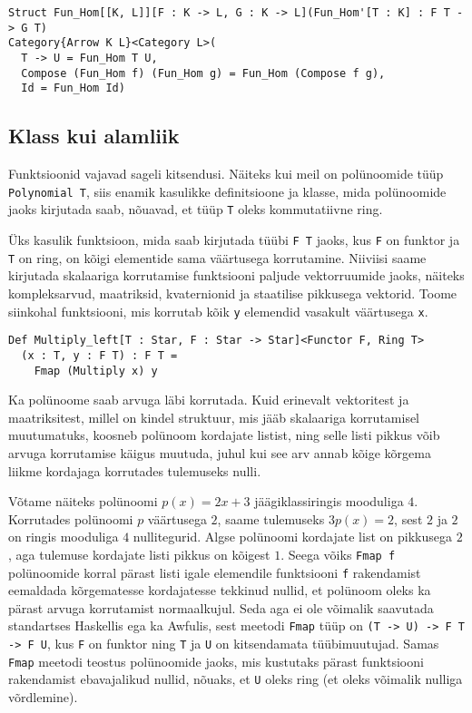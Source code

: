 \documentclass[12pt]{article}
\begin{document}
        \begin{verbatim}Struct Fun_Hom[[K, L]][F : K -> L, G : K -> L](Fun_Hom'[T : K] : F T -> G T)
Category{Arrow K L}<Category L>(
  T -> U = Fun_Hom T U,
  Compose (Fun_Hom f) (Fun_Hom g) = Fun_Hom (Compose f g),
  Id = Fun_Hom Id)\end{verbatim}
    \subsection{Klass kui alamliik}\label{klassliik}
      Funktsioonid vajavad sageli kitsendusi. Näiteks kui meil on polünoomide tüüp \verb!Polynomial T!, siis enamik kasulikke definitsioone ja klasse, mida polünoomide jaoks kirjutada saab, nõuavad, et tüüp \verb!T! oleks kommutatiivne ring.

      Üks kasulik funktsioon, mida saab kirjutada tüübi \verb!F T! jaoks, kus \verb!F! on funktor ja \verb!T! on ring, on kõigi elementide sama väärtusega korrutamine. Niiviisi saame kirjutada skalaariga korrutamise funktsiooni paljude vektorruumide jaoks, näiteks kompleksarvud, maatriksid, kvaternionid ja staatilise pikkusega vektorid. Toome siinkohal funktsiooni, mis korrutab kõik \verb!y! elemendid vasakult väärtusega \verb!x!.

      \begin{verbatim}Def Multiply_left[T : Star, F : Star -> Star]<Functor F, Ring T>
  (x : T, y : F T) : F T =
    Fmap (Multiply x) y\end{verbatim}

      Ka polünoome saab arvuga läbi korrutada. Kuid erinevalt vektoritest ja maatriksitest, millel on kindel struktuur, mis jääb skalaariga korrutamisel muutumatuks, koosneb polünoom kordajate listist, ning selle listi pikkus võib arvuga korrutamise käigus muutuda, juhul kui see arv annab kõige kõrgema liikme kordajaga korrutades tulemuseks nulli.

      Võtame näiteks polünoomi $p(x)=2x+3$ jäägiklassiringis mooduliga $4$. Korrutades polünoomi $p$ väärtusega $2$, saame tulemuseks $3p(x)=2$, sest $2$ ja $2$ on ringis mooduliga $4$ nullitegurid. Algse polünoomi kordajate list on pikkusega $2$, aga tulemuse kordajate listi pikkus on kõigest $1$. Seega võiks \verb!Fmap f! polünoomide korral pärast listi igale elemendile funktsiooni \verb!f! rakendamist eemaldada kõrgematesse kordajatesse tekkinud nullid, et polünoom oleks ka pärast arvuga korrutamist normaalkujul. Seda aga ei ole võimalik saavutada standartses Haskellis ega ka Awfulis, sest meetodi \verb!Fmap! tüüp on \verb!(T -> U) -> F T -> F U!, kus \verb!F! on funktor ning \verb!T! ja \verb!U! on kitsendamata tüübimuutujad. Samas \verb!Fmap! meetodi teostus polünoomide jaoks, mis kustutaks pärast funktsiooni rakendamist ebavajalikud nullid, nõuaks, et \verb!U! oleks ring (et oleks võimalik nulliga võrdlemine).
\end{document}
